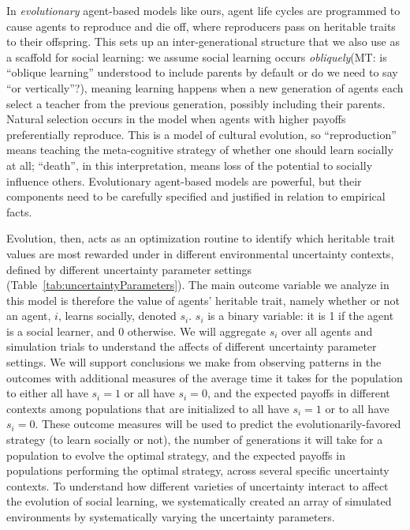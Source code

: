 \documentclass[letterpaper,11.5pt]{scrartcl}
\newcommand{\mt}[1]{{\textcolor{myorange} {({\tiny MT:} #1)}}}
\begin{document}
In \emph{evolutionary} agent-based models like ours, agent life cycles are
programmed to cause agents to reproduce and die off, where reproducers pass on
heritable traits to their offspring. This sets up an inter-generational structure
that we also use as a scaffold for social learning: we assume social learning occurs
\emph{obliquely}\mt{is ``oblique learning'' understood to include parents by default
or do we need to say ``or vertically''?}, meaning learning happens when a new
generation of agents each select a teacher from the previous generation, possibly
including their parents.  Natural selection occurs in the model when agents with higher
payoffs preferentially reproduce. This is a model of cultural evolution, so
``reproduction'' means teaching the meta-cognitive strategy of whether one should learn
socially at all; ``death'', in this interpretation, means
loss of the potential to socially influence others. 
Evolutionary agent-based models are powerful, but their components need to be
carefully specified and justified in relation to empirical facts.

Evolution, then, acts as an optimization routine to identify which heritable trait
values are most rewarded under in different environmental uncertainty contexts,
defined by different uncertainty parameter settings
(Table~\ref{tab:uncertaintyParameters}).  The main outcome variable we analyze in
this model is therefore the value of agents' heritable trait, namely whether or not
an agent, $i$, learns socially, denoted $s_i$. $s_i$ is a binary variable: it is 1
if the agent is a social learner, and 0 otherwise. We will aggregate $s_i$ over all
agents and simulation trials to understand the affects of different uncertainty
parameter settings. We will support conclusions we make from observing patterns in
the outcomes with additional measures of the average time it takes for the
population to either all have $s_i = 1$ or all have $s_i = 0$, and the expected
payoffs in different contexts among populations that are initialized to all have
$s_i = 1$ or to all have $s_i = 0$. These outcome measures will be used to predict
the evolutionarily-favored strategy (to learn socially or not), the number of
generations it will take for a population to evolve the optimal strategy, and the
expected payoffs in populations performing the optimal strategy, across several specific
uncertainty contexts. To understand how different varieties of uncertainty interact
to affect the evolution of social learning, we systematically created an array of
simulated environments by systematically varying the uncertainty parameters. 
\end{document}
